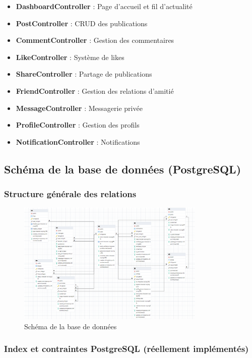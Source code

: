 \documentclass[12pt,a4paper]{article}
\begin{document}
\begin{itemize}
    \item \textbf{DashboardController} : Page d'accueil et fil d'actualit\'e
    \item \textbf{PostController} : CRUD des publications
    \item \textbf{CommentController} : Gestion des commentaires
    \item \textbf{LikeController} : Syst\`eme de likes
    \item \textbf{ShareController} : Partage de publications
    \item \textbf{FriendController} : Gestion des relations d'amiti\'e
    \item \textbf{MessageController} : Messagerie priv\'ee
    \item \textbf{ProfileController} : Gestion des profils
    \item \textbf{NotificationController} : Notifications
\end{itemize}

\subsection{Sch\'ema de la base de donn\'ees (PostgreSQL)}

\subsubsection{Structure g\'en\'erale des relations}

\begin{figure}[H]
    \centering
    \includegraphics[width=0.8\textwidth]{schema.png}
    \caption{Sch\'ema de la base de donn\'ees}
    \label{fig:database_schema}
\end{figure}

\subsubsection{Index et contraintes PostgreSQL (r\'eellement impl\'ement\'es)}
\end{document}
